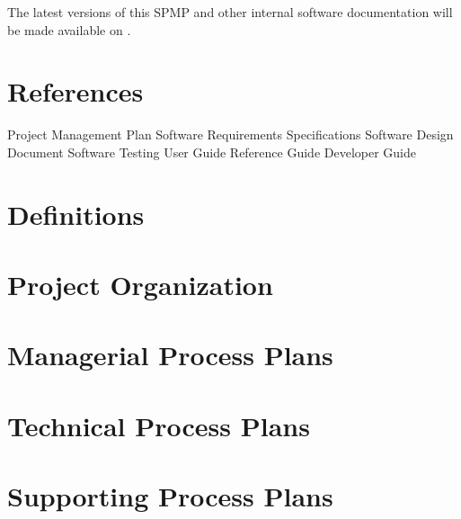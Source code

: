 \documentclass{article}[12pt]
\begin{document}
The latest versions of this SPMP and other internal software
documentation will be made available on
.


\section{References} \label{s:references}

Project Management Plan
Software Requirements Specifications
Software Design Document
Software Testing
User Guide
Reference Guide
Developer Guide

\section{Definitions} \label{s:Definitions}
\section{Project Organization} \label{s:organization}
\section{Managerial Process Plans} \label{s:managerial}
\section{Technical Process Plans} \label{s:technical}
\section{Supporting Process Plans} \label{s:supporting}
\end{document}
